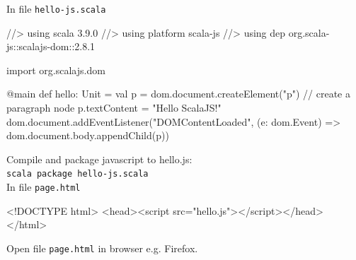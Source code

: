 \documentclass[article, a5paper]{memoir}
\makeatletter
\newcommand{\LangColor}{scalared}
\newcommand{\mc}[1]{\multicolumn{2}{l}{\hspace{-0.65em}\parbox[t]{102mm}{\small #1}}}
\newcommand{\ind}{\hspace*{1.5em}}
\newcommand{\head}[1]{{\bfseries {\color{\LangColor}{#1}}\par\vspace{1mm}\hrule\vspace{-2mm}}}
\newenvironment{etab}%
{\begin{ctabular}{@{}>{\raggedright\small}p{25mm} @{}>{\raggedright\small}p{45mm} @{}>{\raggedright\arraybackslash\small}p{57mm}}}
{\end{ctabular}}%
\newcommand{\subsecend}{\\ \\[-2mm]}
\newcommand{\code}{\lstinline[basicstyle=\ttfamily]}
\newcommand{\Newline}{\vspace{\baselineskip}}
\newcommand{\Comment}[1]{{\color{commentgreen}{#1}}}
\makeatother
\begin{document}



\Newline\vspace*{-0.5em}\head{Create a single page web app using ScalaJS}\Newline
{\small
In file \texttt{hello-js.scala} \hfill\Comment{~ Note double colon before version when using dependencies for ScalaJS. }
\begin{Code}
//> using scala 3.9.0
//> using platform scala-js
//> using dep org.scala-js::scalajs-dom::2.8.1

import org.scalajs.dom

@main def hello: Unit = 
  val p = dom.document.createElement("p")  // create a paragraph node
  p.textContent = "Hello ScalaJS!"
  dom.document.addEventListener("DOMContentLoaded", 
    (e: dom.Event) => dom.document.body.appendChild(p))
\end{Code}
Compile and package javascript to hello.js:\\ \texttt{scala package hello-js.scala}\\[0.5em]
In file \texttt{page.html}
\begin{Code}
<!DOCTYPE html>
<head><script src="hello.js"></script></head>
</html>
\end{Code}
Open file \code{page.html} in browser e.g. Firefox.
}



\end{document}
